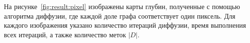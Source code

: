 \documentclass{ConfFTI}
\begin{document}
На рисунке~\ref{fig:result:pixel} изображены карты глубин,
полученные с помощью алгоритма диффузии,
где каждой доле графа соответствует один пиксель.
Для каждого изображения указано количество итераций диффузии,
время выполнения всех итераций, а также количество меток $\left| D \right|$.

\begin{figure}[h!]
    \centering
     \qquad
     \qquad
\end{figure}
\end{document}
